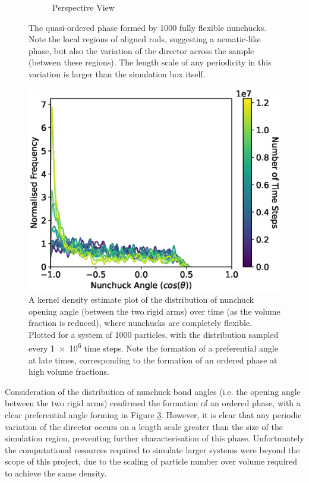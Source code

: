 \documentclass[11pt, a4paper]{article} %
\begin{document}
\begin{figure}
\begin{subfigure}{.5\textwidth}
		\caption{Perspective View}
		\label{fig:nun_fr_perspective}
	\end{subfigure}
	\caption{The quasi-ordered phase formed by \num{1000} fully flexible nunchucks. Note the local regions of aligned rods, suggesting a nematic-like phase, but also the variation of the director across the sample (between these regions). The length scale of any periodicity in this variation is larger than the simulation box itself.}
	\label{fig:nun_fr_views}
\end{figure} %

\begin{figure} [h!]
	\centering
	\includegraphics[width=0.7\linewidth]{Figures/nun_fr_angledist}
	\caption{A kernel density estimate plot of the distribution of nunchuck opening angle (between the two rigid arms) over time (as the volume fraction is reduced), where nunchucks are completely flexible. Plotted for a system of \num{1000} particles, with the distribution sampled every \num{1e6} time steps. Note the formation of a preferential angle at late times, corresponding to the formation of an ordered phase at high volume fractions.}
	\label{fig:nun_fr_angledist}
\end{figure}  %

Consideration of the distribution of nunchuck bond angles (i.e. the opening angle between the two rigid arms) confirmed the formation of an ordered phase, with a clear preferential angle forming in Figure \ref{fig:nun_fr_angledist}. However, it is clear that any periodic variation of the director occurs on a length scale greater than the size of the simulation region, preventing further characterisation of this phase. Unfortunately the computational resources required to simulate larger systems were beyond the scope of this project, due to the scaling of particle number over volume required to achieve the same density. 
\end{document}

